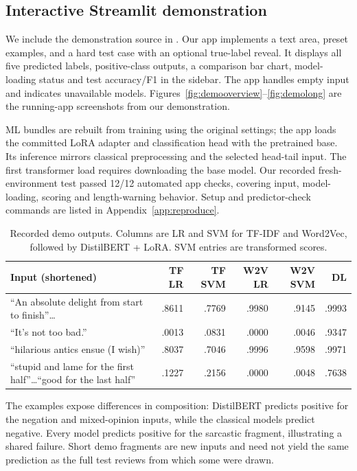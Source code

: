 \subsection{Interactive Streamlit demonstration}\label{sec:demo}
We include the demonstration source in .
Our app implements a text area, preset examples, and a hard test case with
an optional true-label reveal. It displays all five predicted labels,
positive-class outputs, a comparison bar chart, model-loading status and test
accuracy/F1 in the sidebar. The app handles empty input and indicates unavailable
models. Figures~\ref{fig:demooverview}--\ref{fig:demolong} are the running-app
screenshots from our demonstration.

ML bundles are rebuilt from training using the original settings; the app loads
the committed LoRA adapter and classification head with the pretrained base.
Its inference mirrors classical preprocessing and the selected head-tail input.
The first transformer load requires downloading the base model. Our recorded
fresh-environment test passed 12/12 automated app checks, covering input,
model-loading, scoring and length-warning behavior. Setup and predictor-check
commands are listed in Appendix~\ref{app:reproduce}.


\begin{table}[htbp]\centering\small
\caption{Recorded demo outputs. Columns are LR and SVM for TF-IDF and Word2Vec, followed by DistilBERT + LoRA. SVM entries are transformed scores.}\label{tab:demo}
\begin{tabularx}{\linewidth}{@{}Yrrrrr@{}}\toprule
Input (shortened) & TF LR & TF SVM & W2V LR & W2V SVM & DL\\\midrule
``An absolute delight from start to finish''\ldots & .8611 & .7769 & .9980 & .9145 & .9993\\
``It's not too bad.'' & .0013 & .0831 & .0000 & .0046 & .9347\\
``hilarious antics ensue (I wish)'' & .8037 & .7046 & .9996 & .9598 & .9971\\
``stupid and lame for the first half''\ldots ``good for the last half'' & .1227 & .2156 & .0000 & .0048 & .7638\\\bottomrule
\end{tabularx}
\end{table}
The examples expose differences in composition: DistilBERT predicts positive
for the negation and mixed-opinion inputs, while the classical models predict
negative. Every model predicts positive for the sarcastic fragment, illustrating
a shared failure. Short demo fragments are new inputs and need not yield the
same prediction as the full test reviews from which some were drawn.

